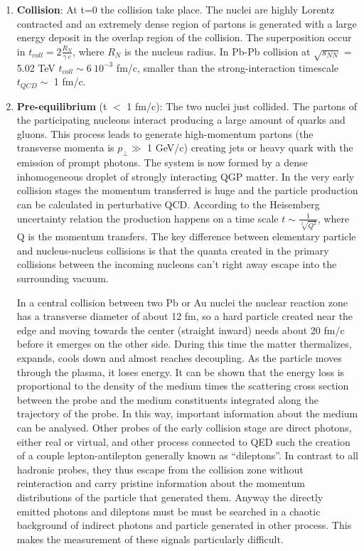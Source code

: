 \documentclass[12pt,a4paper]{book}
\begin{document}
	\begin{enumerate}
		\item \textbf{Collision}: At t=0 the collision take place. The nuclei are highly Lorentz contracted and an extremely dense region of partons is generated with a large energy deposit in the overlap region of the collision. The superposition occur in $t_{coll} = 2 \frac{R_N}{\gamma \ c}$, where $R_N$ is the nucleus radius. In Pb-Pb collision at $\sqrt{s_{NN}}$ = 5.02 TeV $t_{coll} \sim 6 \ 10^{-3}$ fm/c, smaller than the strong-interaction timescale $t_{QCD}\sim$ 1 fm/c. 
		\item \textbf{Pre-equilibrium} (t $<$ 1 fm/c): The two nuclei just collided. The partons of the participating nucleons interact producing a large amount of quarks and gluons. This process leads to generate high-momentum partons (the transverse momenta is $p_\perp \gg$ 1 GeV/c) creating jets or heavy quark with the emission of prompt photons. The system is now formed by a dense inhomogeneous droplet of strongly interacting QGP matter. In the very early collision stages the momentum transferred is huge and the particle production can be calculated in perturbative QCD. According to the Heisemberg uncertainty relation the production happens on a time scale $t \sim \frac{1}{\sqrt[2]{Q^2}}$, where Q is the momentum transfers. The key difference between elementary particle and nucleus-nucleus collisions is that the quanta created in the primary collisions between the incoming nucleons can’t right away escape into the surrounding vacuum. 
		
		In a central collision between two Pb or Au nuclei the nuclear reaction zone has a transverse diameter of about 12 fm, so a hard particle created near the edge and moving towards the center (straight inward) needs about 20 fm/c before it emerges on the other side. During this time the matter thermalizes, expands, cools down and almost reaches decoupling. As the particle moves through the plasma, it loses energy. It can be shown that the energy loss is proportional to the density of the medium times the scattering cross section between the probe and the medium constituents integrated along the trajectory of the probe. In this way, important information about the medium can be analysed. Other probes of the early collision stage are direct photons, either real or virtual, and other process connected to QED such the creation of a couple lepton-antilepton generally known as “dileptons”.  In contrast to all hadronic probes, they thus escape from the collision zone without reinteraction and carry pristine information about the momentum distributions of the particle that generated them. Anyway the directly emitted photons and dileptons must be must be searched in a chaotic background of indirect photons and particle generated in other process. This makes the measurement of these signals particularly difficult. 
		

\end{enumerate}
\end{document}
